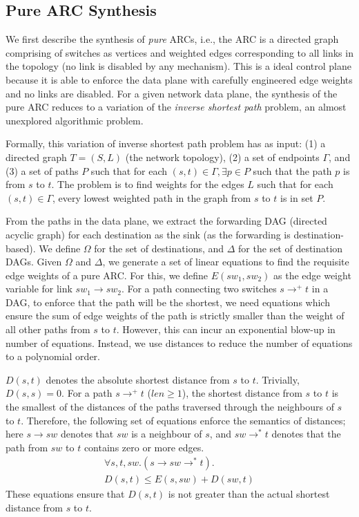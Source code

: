 \subsection{Pure ARC Synthesis}
We first describe the synthesis of {\em pure} ARCs, i.e.,
the ARC is a directed graph comprising of switches as 
vertices and weighted edges corresponding to all links in the
topology (no link is disabled by any mechanism). This is 
a ideal control plane because it is able to enforce the data plane
with carefully engineered edge weights and no links are disabled. 
For a given network data plane, the synthesis of 
the pure ARC reduces to a
variation of the {\em inverse shortest path} problem, an almost 
unexplored algorithmic problem. 

Formally, this variation of inverse shortest path problem 
has as input: (1) a directed graph $T = (S, L)$ (the network topology), 
(2) a set of endpoints $\Gamma$, and 
(3) a set of paths $P$
such that for each $(s,t) \in \Gamma, \exists p \in P$ such
that the path $p$ is from $s$ to $t$. 
The problem is to find weights for the edges $L$ such that 
for each $(s,t) \in \Gamma$, every lowest weighted path 
in the graph 
from $s$ to $t$ is in set $P$. 

From the paths in the data plane, 
we extract the forwarding
DAG (directed acyclic graph) for each destination
as the sink (as the forwarding is destination-based). 
We define $\Omega$ for the 
set of destinations, and $\Delta$ for  
the set of destination DAGs. 
Given $\Omega$ and $\Delta$, we generate a set of linear equations
to find the requisite edge weights of a pure ARC. 
For this, we define $E(sw_1, sw_2)$ as
the edge weight variable for link $sw_1 \rightarrow sw_2$. 
For a path connecting two switches 
$s \rightarrow^+ t$ in a DAG, 
to enforce that the path will be the shortest, we need equations
which ensure the sum of edge weights of the path is strictly smaller than
the weight of all other paths from $s$ to $t$. However, this can incur
an exponential blow-up in number of equations. Instead, we use distances 
to reduce the number of equations to a polynomial order. 

$D(s,t)$ denotes the absolute shortest distance from $s$ to $t$. 
Trivially, $D(s,s) = 0$. For a path $s \rightarrow^+ t$ ($len \geq 1$),
the shortest distance from $s$ to $t$ is the smallest of the distances
of the paths traversed through the neighbours of $s$ to $t$. Therefore, the
following set of equations enforce the semantics of distances; 
here $s \rightarrow sw$ denotes that $sw$ is a neighbour
of $s$, and $sw \rightarrow^* t$ denotes that the path from $sw$ to $t$ contains
zero or more edges.
\begin{multline} \label{eq:dist}
\forall s, t, sw. (s \rightarrow sw \rightarrow^* t).\\
D(s, t) \leq E(s, sw) + D(sw, t)
\end{multline}
These equations ensure that $D(s,t)$ is not greater than 
the actual shortest distance from $s$ to $t$.

